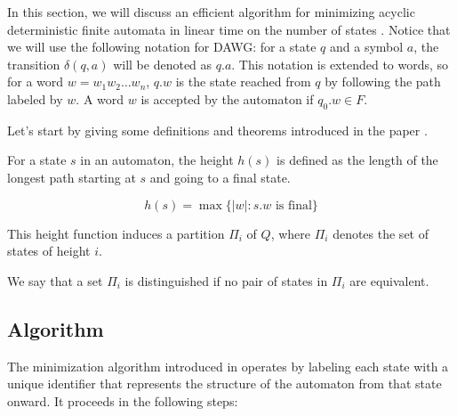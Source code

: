 In this section, we will discuss an efficient algorithm for minimizing acyclic deterministic finite automata in linear time on the number of states \cite{revuz1992minimisation}. Notice that we will use the following notation for DAWG: for a state $q$ and a symbol $a$, the transition $\delta(q,a)$ will be denoted as $q.a$. This notation is extended to words, so for a word $w = w_1w_2\dots w_n$, $q.w$ is the state reached from $q$ by following the path labeled by $w$. A word $w$ is accepted by the automaton if $q_0.w \in F$.

Let's start by giving some definitions and theorems introduced in the paper \cite{revuz1992minimisation}.

\begin{definition} \label{def:height}
    For a state $s$ in an automaton, the height $h(s)$ is defined as the length of the longest path starting at $s$ and going to a final state. 

    $$h(s) = \max\{|w|:s.w \text{ is final}\}$$
\end{definition}

This height function induces a partition $\Pi_i$ of $Q$, where $\Pi_i$ denotes the set of states of height $i$.

\begin{definition}
    We say that a set $\Pi_i$ is distinguished if no pair of states in $\Pi_i$ are equivalent.
\end{definition}

\subsection{Algorithm}
The minimization algorithm introduced in \cite{revuz1992minimisation} operates by labeling each state with a unique identifier that represents the structure of the automaton from that state onward. It proceeds in the following steps:

